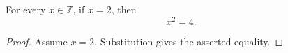 \begin{theorem}\label{conditional}For every $x\in\mathbb{Z}$, if $x=2$, then \[x^2=4.\]\end{theorem}
\begin{proof}Assume $x=2$. Substitution gives the asserted equality.\end{proof}
